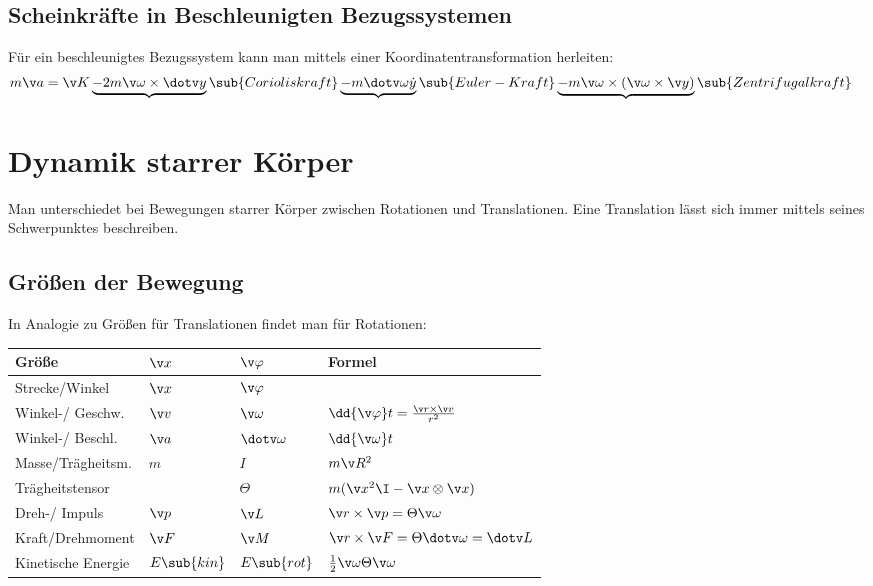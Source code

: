 \documentclass[twocolumn, bfvec]{summery_5.0}
\begin{document}
\subsection{Scheinkräfte in Beschleunigten Bezugssystemen}

Für ein beschleunigtes Bezugssystem kann man mittels einer Koordinatentransformation herleiten:
\begin{align*}
    m\v a &= \v K \underbrace{-2m\v \omega \times \dotv y}\sub{Corioliskraft} \underbrace{- m\dotv \omega \dot y}\sub{Euler-Kraft} \underbrace{-m\v \omega\times(\v \omega\times\v y)}\sub{Zentrifugalkraft} 
\end{align*}

\section{Dynamik starrer Körper}
Man unterschiedet bei Bewegungen starrer Körper zwischen Rotationen und Translationen. Eine Translation lässt sich immer mittels seines Schwerpunktes beschreiben.

\subsection{Größen der Bewegung}
In Analogie zu Größen für Translationen findet man für Rotationen:
\begin{center}
\begin{tabular}{@{}llll@{}}
    \toprule
    Größe & $\v x$ & $\v \varphi$  &Formel\\
    \midrule
    Strecke/Winkel & $\v x$ & \(\v \varphi\) & $ $ \\
    Winkel-/ Geschw. & $\v v$ & \(\v \omega\) & $\dd{\v\varphi} t = \frac{\v r \times \v v }{r^2}$ \\
    Winkel-/ Beschl. & $\v a$ & \(\dotv \omega\) & $ \dd {\v \omega}t$ \\
    Masse/Trägheitsm. & $m$ & \(I\) & $ m\v R^2 $ \\
    Trägheitstensor &  & \(\Theta\) & $ m(\v x^2\I - \v x\otimes \v x) $ \\
    Dreh-/ Impuls & $\v p$ & \(\v L\) & $ \v r \times \v p = \Theta \v \omega $ \\
    Kraft/Drehmoment & $\v F$ & \(\v M\) & $ \v r \times \v F = \Theta \dotv \omega= \dotv  L$ \\
    Kinetische Energie & $E\sub{kin}$ & \(E\sub{rot}\) & $\frac12 \v \omega \Theta \v \omega$ \\
    \bottomrule
\end{tabular}
\end{center}
\end{document}
